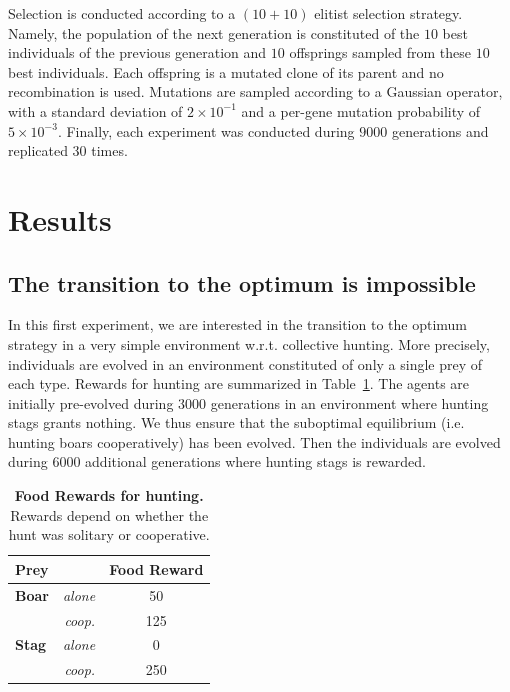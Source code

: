     Selection is conducted according to a \((10 + 10)\) elitist selection strategy. Namely, the population of the next generation is constituted of the $10$ best individuals of the previous generation and $10$ offsprings sampled from these $10$ best individuals. Each offspring is a mutated clone of its parent and no recombination is used. Mutations are sampled according to a Gaussian operator, with a standard deviation of \(2 \times 10^{-1}\) and a per-gene mutation probability of \(5 \times 10^{-3}\). Finally, each experiment was conducted during $9000$ generations and replicated $30$ times.

\section{Results}
  \subsection{The transition to the optimum is impossible}
    In this first experiment, we are interested in the transition to the optimum strategy in a very simple environment w.r.t. collective hunting. More precisely, individuals are evolved in an environment constituted of only a single prey of each type. Rewards for hunting are summarized in Table~\ref{table:tableRewards}. The agents are initially pre-evolved during $3000$ generations in an environment where hunting stags grants nothing. We thus ensure that the suboptimal equilibrium (i.e. hunting boars cooperatively) has been evolved. Then the individuals are evolved during $6000$ additional generations where hunting stags is rewarded.

    \begin{table}[ht]
      \centering
        \begin{tabular}{|l|r|c|}
          \hline
          \multicolumn{2}{|l|}{\textbf{Prey}} & \textbf{Food Reward} \\
          \hline
          \hline
          \textbf{Boar} & \textit{alone} & 50 \\
          \hline
          & \textit{coop.} & 125 \\
          \hline
          \textbf{Stag} & \textit{alone} & 0 \\
          \hline
          & \textit{coop.} & 250 \\
          \hline
        \end{tabular}
        \caption{\textbf{Food Rewards for hunting.}
        Rewards depend on whether the hunt was solitary or cooperative.}
      \label{table:tableRewards}
    \end{table}

